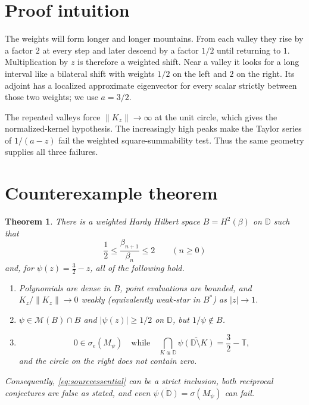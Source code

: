 \documentclass[11pt]{article}
\newtheorem{theorem}{Theorem}
\newcommand{\D}{\mathbb D}
\newcommand{\T}{\mathbb T}
\begin{document}
\section*{Proof intuition}

The weights will form longer and longer mountains.  From each valley they
rise by a factor $2$ at every step and later descend by a factor $1/2$ until
returning to $1$.  Multiplication by $z$ is therefore a weighted shift.  Near
a valley it looks for a long interval like a bilateral shift with weights
$1/2$ on the left and $2$ on the right.  Its adjoint has a localized
approximate eigenvector for every scalar strictly between those two weights;
we use $a=3/2$.

The repeated valleys force $\|K_z\|\to\infty$ at the unit circle, which gives
the normalized-kernel hypothesis.  The increasingly high peaks make the
Taylor series of $1/(a-z)$ fail the weighted square-summability test.  Thus
the same geometry supplies all three failures.

\section*{Counterexample theorem}

\begin{theorem}\label{thm:main}
There is a weighted Hardy Hilbert space $B=H^2(\beta)$ on $\D$ such that
\[
 \frac12\leq\frac{\beta_{n+1}}{\beta_n}\leq2\qquad(n\geq0)
\]
and, for $\psi(z)=\frac32-z$, all of the following hold.
\begin{enumerate}
\item Polynomials are dense in $B$, point evaluations are bounded, and
      $K_z/\|K_z\|\to0$ weakly (equivalently weak-star in $B^*$) as
      $|z|\to1$.
\item $\psi\in\mathcal M(B)\cap B$ and $|\psi(z)|\geq1/2$ on $\D$, but
      $1/\psi\notin B$.
\item
\[
 0\in\sigma_e(M_\psi)
 \quad\text{while}\quad
 \bigcap_{K\Subset\D}\overline{\psi(\D\setminus K)}
 =\frac32-\T,
\]
and the circle on the right does not contain zero.
\end{enumerate}
Consequently, \eqref{eq:sourceessential} can be a strict inclusion, both
reciprocal conjectures are false as stated, and even
$\overline{\psi(\D)}=\sigma(M_\psi)$ can fail.
\end{theorem}
\end{document}
